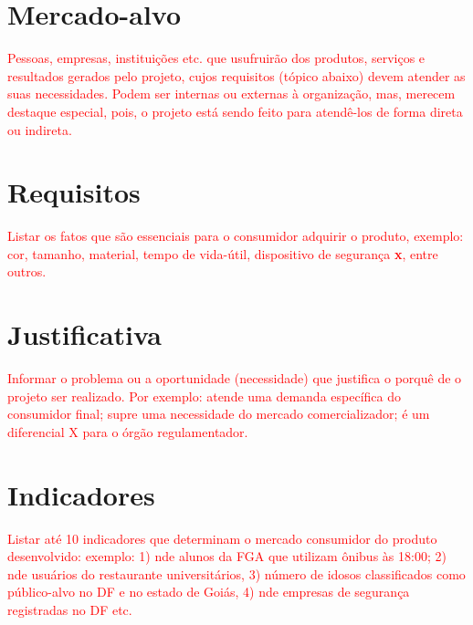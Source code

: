\section{Mercado-alvo}

\textcolor{red}{Pessoas, empresas, instituições etc. que usufruirão dos produtos, serviços e resultados gerados pelo projeto, cujos requisitos (tópico abaixo) devem atender as suas necessidades. Podem ser internas ou externas à organização, mas, merecem destaque especial, pois, o projeto está sendo feito para atendê-los de forma direta ou indireta.}

\section{Requisitos}

\textcolor{red}{Listar os fatos que são essenciais para o consumidor adquirir o produto, exemplo: cor, tamanho, material, tempo de vida-útil, dispositivo de segurança \textbf{x}, entre outros.}

\section{Justificativa}

\textcolor{red}{Informar o problema ou a oportunidade (necessidade) que justifica o porquê de o projeto ser realizado. Por exemplo: atende uma demanda específica do consumidor final; supre uma necessidade do mercado comercializador; é um diferencial X para o órgão regulamentador.}

\section{Indicadores}

\textcolor{red}{Listar até 10 indicadores que determinam o mercado consumidor do produto desenvolvido: exemplo: 1) n\textdegree de alunos da FGA que utilizam ônibus às 18:00; 2) n\textdegree de usuários do restaurante universitários, 3) número de idosos classificados como público-alvo no DF e no estado de Goiás, 4) n\textdegree de empresas de segurança registradas no DF etc.}

